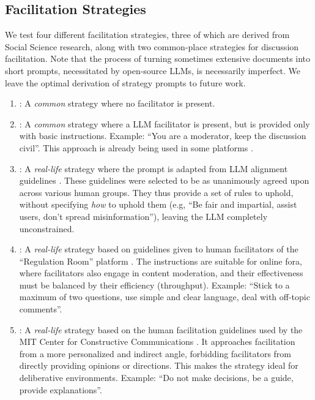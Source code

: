 \subsection{Facilitation Strategies}
\label{ssec:experimental:strategies}

We test four different facilitation strategies, three of which are derived from Social Science research, along with two common-place strategies for discussion facilitation. Note that the process of turning sometimes extensive documents into short prompts, necessitated by open-source LLMs, is necessarily imperfect. We leave the optimal derivation of strategy prompts to future work.

\begin{enumerate}
    \item \textbf{\strategynomod}: A \emph{common} strategy where no facilitator is present.

    \item \textbf{\strategynoinstr}: A \emph{common} strategy where a LLM facilitator is present, but is provided only with basic instructions. Example: “You are a moderator, keep the discussion civil”. This approach is already being used in some platforms \citep{Tsai_Deliberate_Lab_Open-Source_2025}.

    \item \textbf{\strategyrules}: A \emph{real-life} strategy where the prompt is adapted from LLM alignment guidelines \cite{collective_constitution}. These guidelines were selected to be as unanimously agreed upon across various human groups. They thus provide a set of rules to uphold, without specifying \emph{how} to uphold them (e.g, “Be fair and impartial, assist users, don't spread misinformation”), leaving the LLM completely unconstrained.

    \item \textbf{\strategyregroom}: A \emph{real-life} strategy based on guidelines given to human facilitators of the ``Regulation Room'' platform \citep{Cornell_eRulemaking2017}. The instructions are suitable for online fora, where facilitators also engage in content moderation, and their effectiveness must be balanced by their efficiency (throughput). Example: ``Stick to a maximum of two questions, use simple and clear language, deal with off-topic comments''.

    \item \textbf{\strategyconstrcomm}: A \emph{real-life} strategy based on the human facilitation guidelines used by the MIT Center for Constructive Communications \cite{dimitra-book}. It approaches facilitation from a more personalized and indirect angle, forbidding facilitators from directly providing opinions or directions. This makes the strategy ideal for deliberative environments. Example: ``Do not make decisions, be a guide, provide explanations''.
    

\end{enumerate}
